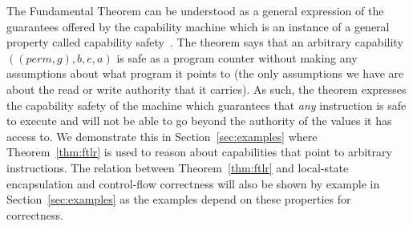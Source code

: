 \documentclass[format=acmsmall, review=true, screen=true]{acmart}
\renewcommand{\sectionname}{Section}
\newcommand{\var}[1]{\mathit{#1}}
\newcommand{\gl}{\var{g}}
\newcommand{\addr}{\var{a}}
\newcommand{\start}{\var{b}}
\newcommand{\addrend}{\var{e}}
\newcommand{\perm}{\var{perm}}
\newcommand{\itoplassug}[1]{}
\begin{document}
The Fundamental Theorem can be understood as a general expression of the guarantees offered by the capability machine which is an instance of a general property called capability safety~\citep{Devriese:2016ObjCap,Maffeis2010OC}.
The theorem says that an arbitrary capability $((\perm,\gl),\start,\addrend,\addr)$ is safe as a program counter without making any assumptions about what program it points to (the only assumptions we have are about the read or write authority that it carries).
As such, the theorem expresses the capability safety of the machine which guarantees that \emph{any} instruction is safe to execute and will not be able to go beyond the authority of the values it has access to.
We demonstrate this in \sectionname~\ref{sec:examples} where Theorem~\ref{thm:ftlr} is used to reason about capabilities that point to arbitrary instructions.
The relation between Theorem~\ref{thm:ftlr} and local-state encapsulation and control-flow correctness will also be shown by example in \sectionname~\ref{sec:examples} as the examples depend on these properties for correctness.




\itoplassug{Suggestion: Add a small section about reasoning about programs. Add the ``scall works'' and ``malloc works'' lemmas and describe how they are used. This section could also point out the things one have to argue about that are hidden in similar high-level proofs (e.g., the return pointer valid when we return corresponding to restoring memory invariants of caller.).}
\end{document}
